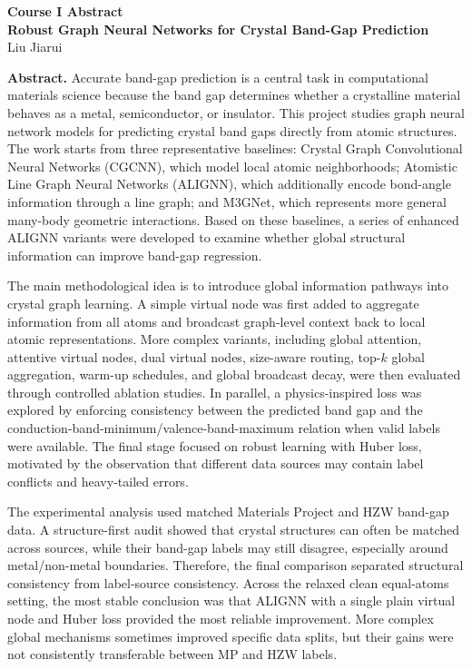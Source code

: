 \documentclass[11pt,a4paper]{article}
\begin{document}
\begin{center}
{\Large\bfseries Course I Abstract}\\[0.35em]
{\bfseries Robust Graph Neural Networks for Crystal Band-Gap Prediction}\\[0.25em]
Liu Jiarui
\end{center}

\textbf{Abstract.}
Accurate band-gap prediction is a central task in computational materials science because the band gap determines whether a crystalline material behaves as a metal, semiconductor, or insulator. This project studies graph neural network models for predicting crystal band gaps directly from atomic structures. The work starts from three representative baselines: Crystal Graph Convolutional Neural Networks (CGCNN), which model local atomic neighborhoods; Atomistic Line Graph Neural Networks (ALIGNN), which additionally encode bond-angle information through a line graph; and M3GNet, which represents more general many-body geometric interactions. Based on these baselines, a series of enhanced ALIGNN variants were developed to examine whether global structural information can improve band-gap regression.

The main methodological idea is to introduce global information pathways into crystal graph learning. A simple virtual node was first added to aggregate information from all atoms and broadcast graph-level context back to local atomic representations. More complex variants, including global attention, attentive virtual nodes, dual virtual nodes, size-aware routing, top-\(k\) global aggregation, warm-up schedules, and global broadcast decay, were then evaluated through controlled ablation studies. In parallel, a physics-inspired loss was explored by enforcing consistency between the predicted band gap and the conduction-band-minimum/valence-band-maximum relation when valid labels were available. The final stage focused on robust learning with Huber loss, motivated by the observation that different data sources may contain label conflicts and heavy-tailed errors.

The experimental analysis used matched Materials Project and HZW band-gap data. A structure-first audit showed that crystal structures can often be matched across sources, while their band-gap labels may still disagree, especially around metal/non-metal boundaries. Therefore, the final comparison separated structural consistency from label-source consistency. Across the relaxed clean equal-atoms setting, the most stable conclusion was that ALIGNN with a single plain virtual node and Huber loss provided the most reliable improvement. More complex global mechanisms sometimes improved specific data splits, but their gains were not consistently transferable between MP and HZW labels.
\end{document}
